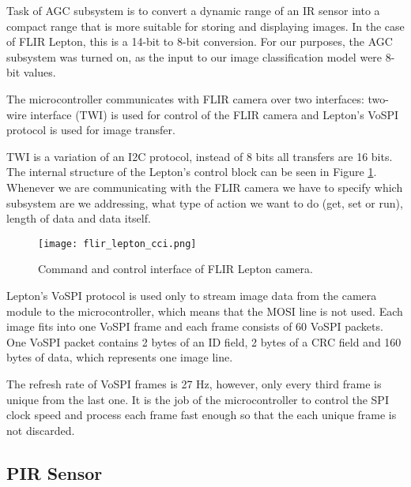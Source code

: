 Task of AGC subsystem is to convert a dynamic range of an IR sensor into a compact range that is more suitable for storing and displaying images.
In the case of FLIR Lepton, this is a 14-bit to 8-bit conversion.
For our purposes, the AGC subsystem was turned on, as the input to our image classification model were 8-bit values.

The microcontroller communicates with FLIR camera over two interfaces: two-wire interface (TWI) is used for control of the FLIR camera and Lepton's VoSPI protocol is used for image transfer.

TWI is a variation of an I2C protocol, instead of 8 bits all transfers are 16 bits.
The internal structure of the Lepton's control block can be seen in Figure \ref{flir_lepton_cci}.
Whenever we are communicating with the FLIR camera we have to specify which subsystem are we addressing, what type of action we want to do (get, set or run), length of data and data itself.

\begin{figure}[ht]
        \centering
        \texttt{[image: flir\_lepton\_cci.png]} 
        \caption{ Command and control interface of FLIR Lepton camera.} 
        \label{flir_lepton_cci}
\end{figure}

Lepton's VoSPI protocol is used only to stream image data from the camera module to the microcontroller, which means that the MOSI line is not used.
Each image fits into one VoSPI frame and each frame consists of 60 VoSPI packets.
One VoSPI packet contains 2 bytes of an ID field, 2 bytes of a CRC field and 160 bytes of data\footnotemark, which represents one image line.

The refresh rate of VoSPI frames is 27 \si{\hertz}, however, only every third frame is unique from the last one.
It is the job of the microcontroller to control the SPI clock speed and process each frame fast enough so that the each unique frame is not discarded.
\subsection{ PIR Sensor}

